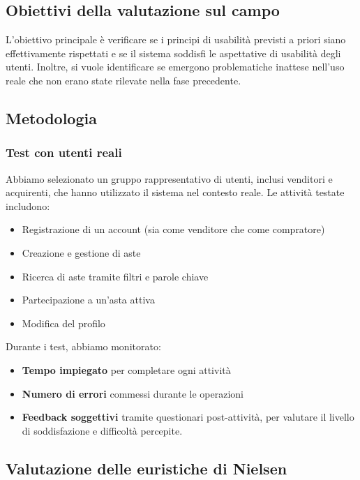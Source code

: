 \subsection{Obiettivi della valutazione sul campo}

L'obiettivo principale è verificare se i principi di usabilità previsti a priori siano effettivamente rispettati e se il sistema soddisfi le aspettative di usabilità degli utenti. Inoltre, si vuole identificare se emergono problematiche inattese nell'uso reale che non erano state rilevate nella fase precedente.

\subsection{Metodologia}

\subsubsection{Test con utenti reali}
Abbiamo selezionato un gruppo rappresentativo di utenti, inclusi venditori e acquirenti, che hanno utilizzato il sistema nel contesto reale. Le attività testate includono:
\begin{itemize}
    \item Registrazione di un account (sia come venditore che come compratore)
    \item Creazione e gestione di aste
    \item Ricerca di aste tramite filtri e parole chiave
    \item Partecipazione a un'asta attiva
    \item Modifica del profilo
\end{itemize}

Durante i test, abbiamo monitorato:
\begin{itemize}
    \item \textbf{Tempo impiegato} per completare ogni attività
    \item \textbf{Numero di errori} commessi durante le operazioni
    \item \textbf{Feedback soggettivi} tramite questionari post-attività, per valutare il livello di soddisfazione e difficoltà percepite.
\end{itemize}

\subsection{Valutazione delle euristiche di Nielsen}

